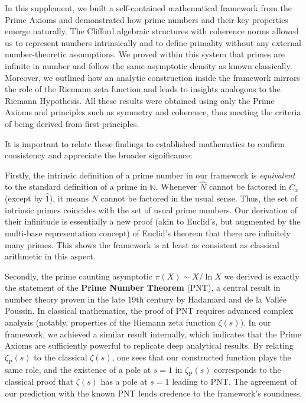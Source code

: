 \documentclass[11pt]{article}
\begin{document}
In this supplement, we built a self-contained mathematical framework from the Prime Axioms and demonstrated how prime numbers and their key properties emerge naturally. The Clifford algebraic structures with coherence norms allowed us to represent numbers intrinsically and to define primality without any external number-theoretic assumptions. We proved within this system that primes are infinite in number and follow the same asymptotic density as known classically. Moreover, we outlined how an analytic construction inside the framework mirrors the role of the Riemann zeta function and leads to insights analogous to the Riemann Hypothesis. All these results were obtained using only the Prime Axioms and principles such as symmetry and coherence, thus meeting the criteria of being derived from first principles.

It is important to relate these findings to established mathematics to confirm consistency and appreciate the broader significance:

Firstly, the intrinsic definition of a prime number in our framework is \emph{equivalent} to the standard definition of a prime in $\mathbb{N}$. Whenever $\hat{N}$ cannot be factored in $C_x$ (except by $\hat{1}$), it means $N$ cannot be factored in the usual sense. Thus, the set of intrinsic primes coincides with the set of usual prime numbers. Our derivation of their infinitude is essentially a new proof (akin to Euclid's, but augmented by the multi-base representation concept) of Euclid’s theorem that there are infinitely many primes. This shows the framework is at least as consistent as classical arithmetic in this aspect.

Secondly, the prime counting asymptotic $\pi(X) \sim X/\ln X$ we derived is exactly the statement of the \textbf{Prime Number Theorem} (PNT), a central result in number theory proven in the late 19th century by Hadamard and de la Vallée Poussin. In classical mathematics, the proof of PNT requires advanced complex analysis (notably, properties of the Riemann zeta function $\zeta(s)$). In our framework, we achieved a similar result internally, which indicates that the Prime Axioms are sufficiently powerful to replicate deep analytical results. By relating $\zeta_{\mathrm{P}}(s)$ to the classical $\zeta(s)$, one sees that our constructed function plays the same role, and the existence of a pole at $s=1$ in $\zeta_{\mathrm{P}}(s)$ corresponds to the classical proof that $\zeta(s)$ has a pole at $s=1$ leading to PNT. The agreement of our prediction with the known PNT lends credence to the framework’s soundness.
\end{document}
